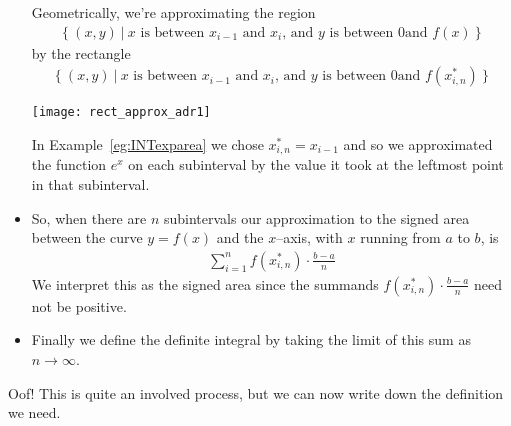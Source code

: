 \begin{itemize}
Geometrically, we're approximating the region
\begin{align*}
\big\{\ (x,y)\ \big|\
\text{$x$ is between $x_{i-1}$ and $x_i$, and $y$ is between $0$
 and $f(x)$} \ \big\}
\end{align*}
by the rectangle
\begin{align*}
\big\{\ (x,y)\ \big|\
\text{$x$ is between $x_{i-1}$ and $x_i$, and $y$ is between $0$
 and $f(x_{i,n}^*)$} \ \big\}
\end{align*}
     \begin{efig}
     \begin{center}
         \texttt{[image: rect\_approx\_adr1]}
     \end{center}
     \end{efig}
In Example~\ref{eg:INTexparea} we chose $x_{i,n}^* = x_{i-1}$ and so we
approximated the function $e^x$ on each subinterval by the value it took at the leftmost
point in that subinterval.

\item So, when there are $n$ subintervals our approximation to the signed
area between the curve $y=f(x)$ and the $x$--axis, with $x$ running from
$a$ to $b$, is
\begin{align*}
\sum_{i=1}^n f(x_{i,n}^*)\cdot \frac{b-a}{n}
\end{align*}
We interpret this as the signed area since the summands $f(x_{i,n}^*)\cdot\frac{b-a}{n}$
need not be positive.

\item Finally we define the definite integral by taking the limit of this sum as
$n\rightarrow\infty$.

\end{itemize}
Oof! This is quite an involved process, but we can now write down the definition we need.

